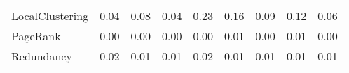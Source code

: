 \begin{table}[H]
{\begin{tabular}{|p{40mm}|ccc|ccccc|}
                  LocalClustering &                   {\small 0.04} &                  {\small 0.08} &                  {\small 0.04} &                     {\small 0.23} &                   {\small 0.16} &                     {\small 0.09} &                     {\small 0.12} &                     {\small 0.06} \\
                         PageRank &                   {\small 0.00} &                  {\small 0.00} &                  {\small 0.00} &                     {\small 0.00} &                   {\small 0.01} &                     {\small 0.00} &                     {\small 0.01} &                     {\small 0.00} \\
                       Redundancy &                   {\small 0.02} &                  {\small 0.01} &                  {\small 0.01} &                     {\small 0.02} &                   {\small 0.01} &                     {\small 0.01} &                     {\small 0.01} &                     {\small 0.01} \\
\bottomrule
\end{tabular}
}
\end{table}
